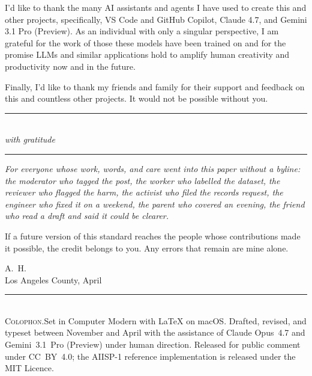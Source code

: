 \documentclass[10pt,a4paper,twocolumn]{article}
\begin{document}
I'd like to thank the many AI assistants and agents I have used to create this and other projects, specifically, VS Code and GitHub Copilot, Claude 4.7, and Gemini 3.1 Pro (Preview). As an individual with only a singular perspective, I am grateful for the work of those these models have been trained on and for the promise LLMs and similar applications hold to amplify human creativity and productivity now and in the future.

Finally, I'd like to thank my friends and family for their support and feedback on this and countless other projects. It would not be possible without you.

\vspace{2.5em}

\begin{center}
\rule{0.25\textwidth}{0.4pt}\\[6pt]
{\itshape with gratitude}\\[6pt]
\rule{0.25\textwidth}{0.4pt}
\end{center}

\vspace{1em}

\begin{center}
\begin{minipage}{0.78\textwidth}
\small\itshape\noindent
For everyone whose work, words, and care went into this paper without a byline: the moderator who tagged the post, the worker who labelled the dataset, the reviewer who flagged the harm, the activist who filed the records request, the engineer who fixed it on a weekend, the parent who covered an evening, the friend who read a draft and said it could be clearer.

If a future version of this standard reaches the people whose contributions made it possible, the credit belongs to you. Any errors that remain are mine alone.

\medskip
\centering
\upshape
A.~H. \\
Los Angeles County, April \the\year
\end{minipage}
\end{center}

\vspace{1.5em}

\begin{center}
\rule{0.6\textwidth}{0.3pt}\\[3pt]
{\scriptsize\sffamily\textsc{Colophon.}\quad Set in Computer Modern with \LaTeX{} on macOS. Drafted, revised, and typeset between November \the\numexpr{}\relax{} and April \the\year{} with the assistance of Claude Opus~4.7 and Gemini~3.1~Pro (Preview) under human direction. Released for public comment under CC~BY~4.0; the AIISP-1 reference implementation is released under the MIT Licence.}
\end{center}
\end{document}
